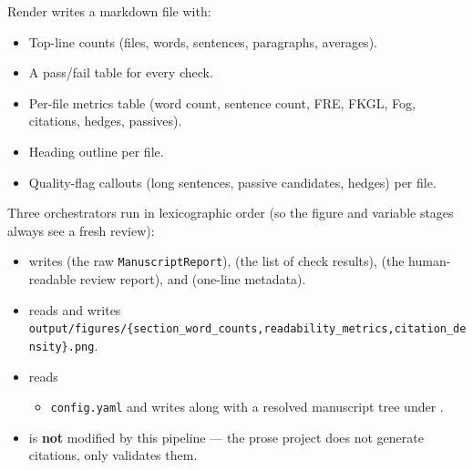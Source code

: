 \documentclass[
  ignorenonframetext,
]{beamer}
\providecommand{\tightlist}{%
  \setlength{\itemsep}{0pt}\setlength{\parskip}{0pt}}
\begin{document}
\begin{frame}{Render}
\protect{}\label{render}
 writes a markdown file
with:

\begin{itemize}
\tightlist
\item
  Top-line counts (files, words, sentences, paragraphs, averages).
\item
  A pass/fail table for every check.
\item
  Per-file metrics table (word count, sentence count, FRE, FKGL, Fog,
  citations, hedges, passives).
\item
  Heading outline per file.
\item
  Quality-flag callouts (long sentences, passive candidates, hedges) per
  file.
\end{itemize}

Three orchestrators run in lexicographic order (so the figure and
variable stages always see a fresh review):

\begin{itemize}
\tightlist
\item
   writes
   (the raw
  \texttt{ManuscriptReport}),  (the list of
  check results),  (the human-readable
  review report), and  (one-line
  metadata).
\item
   reads
   and writes
  \texttt{output/figures/\{section\_word\_counts,readability\_metrics,citation\_density\}.png}.
\item
   reads

  \begin{itemize}
  \tightlist
  \item
    \texttt{config.yaml} and writes
     along with a
    resolved manuscript tree under .
  \end{itemize}
\item
   is \textbf{not} modified by this
  pipeline --- the prose project does not generate citations, only
  validates them.
\end{itemize}
\end{frame}
\end{document}

